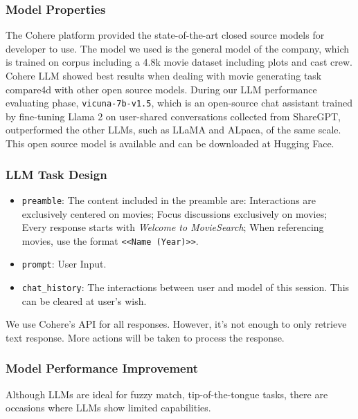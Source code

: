 \documentclass[journal]{IEEEtran}
\theoremstyle{mydefstyle}
\begin{document}
\subsubsection{Model Properties}
The Cohere platform provided the state-of-the-art closed source models for developer to use. The model we used is the general model of the company, which is trained on corpus including a 4.8k movie dataset including plots and cast crew.\cite{cohere_movies_dataset} Cohere LLM showed best results when dealing with movie generating task compare4d with other open source models. During our LLM performance evaluating phase, \texttt{vicuna-7b-v1.5}, which is an open-source chat assistant trained by fine-tuning Llama 2 on user-shared conversations collected from ShareGPT, outperformed the other LLMs, such as LLaMA and ALpaca, of the same scale\cite{zheng2023judging}. This open source model is available and can be downloaded at Hugging Face.  

\subsubsection{LLM Task Design}
\begin{itemize}
  \item \texttt{preamble}: The content included in the preamble are: Interactions are exclusively centered on movies; Focus discussions exclusively on movies; Every response starts with \textit{Welcome to MovieSearch}; When referencing movies, use the format \texttt{<<Name (Year)>>}.
  \item \texttt{prompt}: User Input.
  \item \texttt{chat\_history}: The interactions between user and model of this session. This can be cleared at user's wish.
\end{itemize}

We use Cohere's API for all responses. However, it's not enough to only retrieve text response. More actions will be taken to process the response.

\subsubsection{Model Performance Improvement}
Although LLMs are ideal for fuzzy match, tip-of-the-tongue tasks, there are occasions where LLMs show limited capabilities.
\end{document}
